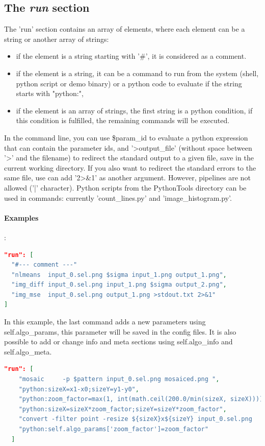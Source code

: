 \subsection{The \emph{run} section}

The 'run' section contains an array of elements, where each element can be 
a string or another array of strings:
\begin{itemize}
\item if the element is a string starting with '\#', it is considered as a comment.
\item if the element is a string, it can be a command to run from the system (shell, 
python script or demo binary) or a python code to evaluate if the string
starts with "python:",
\item if the element is an array of strings, the first string is a python
condition, if this condition is fulfilled, the remaining commands will be
executed.
\end{itemize}
In the command line, you can use \$param\_id to evaluate a 
python expression that can contain the parameter ids,
and '\textgreater output\_file' (without space between '\textgreater' and the 
filename) to redirect the standard output to a given file, save in the current 
working directory. 
If you also want to redirect the standard errors to the same file, use can add 
'2\textgreater\&1' as another argument. However, pipelines are not allowed 
('|' character).
Python scripts from the PythonTools directory can be used in commands: currently
'count\_lines.py' and 'image\_histogram.py'.


\paragraph{Examples}:\\
\begin{lstlisting}[language=json,firstnumber=1]
"run": [
  "#--- comment ---"
  "nlmeans  input_0.sel.png $sigma input_1.png output_1.png",
  "img_diff input_0.sel.png input_1.png $sigma output_2.png",
  "img_mse  input_0.sel.png output_1.png >stdout.txt 2>&1"
]
\end{lstlisting}

In this example, the last command adds a new parameters using self.algo\_params,
this parameter will be saved in the config files. It is also possible to add 
or change info and meta sections using self.algo\_info and self.algo\_meta.
\begin{lstlisting}[language=json,firstnumber=1]
  "run": [ 
    "mosaic     -p $pattern input_0.sel.png mosaiced.png ",
    "python:sizeX=x1-x0;sizeY=y1-y0",
    "python:zoom_factor=max(1, int(math.ceil(200.0/min(sizeX, sizeX))))",
    "python:sizeX=sizeX*zoom_factor;sizeY=sizeY*zoom_factor",
    "convert -filter point -resize ${sizeX}x${sizeY} input_0.sel.png    input_0.sel_zoom.png",
    "python:self.algo_params['zoom_factor']=zoom_factor"
  ]
\end{lstlisting}

